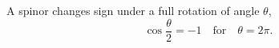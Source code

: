 \documentclass{article}
\begin{document}
A spinor changes sign under a full rotation of angle $\theta$,
\begin{equation}
\cos\frac{\theta}{2} = -1 \quad \text{for} \quad \theta = 2\pi .
\label{eq:full}
\end{equation}
\end{document}
